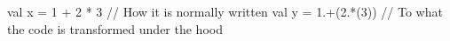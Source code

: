 val x = 1 + 2 * 3 // How it is normally written
val y = 1.+(2.*(3)) // To what the code is transformed under the hood